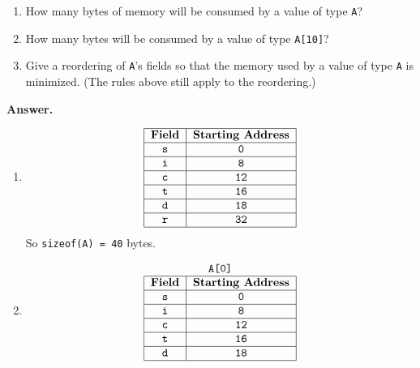 \documentclass[9pt]{article}
\begin{document}
\begin{enumerate}
         \begin{enumerate}
            \item How many bytes of memory will be consumed by a value of type
                  \verb|A|?
            \item How many bytes will be consumed by a value of type
                  \verb|A[10]|?
            \item Give a reordering of \verb|A|'s fields so that the memory used
                  by a value of type \verb|A| is minimized. (The rules above
                  still apply to the reordering.)
         \end{enumerate}

      \textbf{Answer.}

      \begin{enumerate}
         \item $$
                  \begin{tabular}{@{}|c|c|@{}} \hline
                     \textbf{Field} & \textbf{Starting Address} \\ \hline
                     \verb|s| & \verb|0| \\ \hline
                     \verb|i| & \verb|8| \\ \hline
                     \verb|c| & \verb|12| \\ \hline
                     \verb|t| & \verb|16| \\ \hline
                     \verb|d| & \verb|18| \\ \hline
                     \verb|r| & \verb|32| \\ \hline
                  \end{tabular}
               $$
               So \verb|sizeof(A) = 40| bytes.
         \item $$
                  \begin{tabular}{@{}|c|c|@{}}
                     \multicolumn{2}{c}{\texttt{A[0]}} \\ \hline
                     \textbf{Field} & \textbf{Starting Address} \\ \hline
                     \verb|s| & \verb|0| \\ \hline
                     \verb|i| & \verb|8| \\ \hline
                     \verb|c| & \verb|12| \\ \hline
                     \verb|t| & \verb|16| \\ \hline
                     \verb|d| & \verb|18| \\ \hline

\end{tabular}$$
\end{enumerate}
\end{enumerate}
\end{document}
